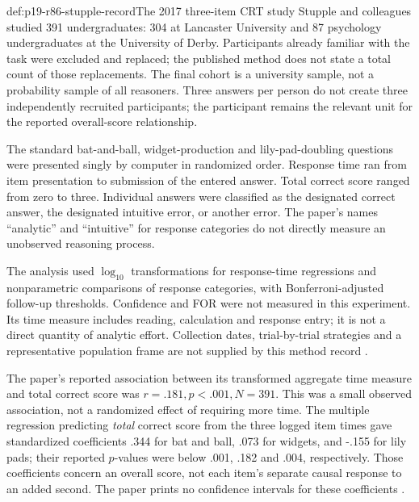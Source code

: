 \begin{hbdefinition}{def:p19-r86-stupple-record}{The 2017 three-item CRT study}
Stupple and colleagues studied 391 undergraduates: 304 at Lancaster University
and 87 psychology undergraduates at the University of Derby. Participants
already familiar with the task were excluded and replaced; the published
method does not state a total count of those replacements. The final cohort
is a university sample, not a probability sample of all reasoners.
Three answers per person do not create three independently recruited
participants; the participant remains the relevant unit for the reported
overall-score relationship.

The standard bat-and-ball, widget-production and lily-pad-doubling questions
were presented singly by computer in randomized order. Response time ran from
item presentation to submission of the entered answer. Total correct score
ranged from zero to three. Individual answers were classified as the designated
correct answer, the designated intuitive error, or another error. The paper's
names ``analytic'' and ``intuitive'' for response categories do not directly
measure an unobserved reasoning process.

The analysis used \(\log_{10}\) transformations for response-time regressions
and nonparametric comparisons of response categories, with Bonferroni-adjusted
follow-up thresholds. Confidence and FOR were not measured in this experiment.
Its time measure includes reading, calculation and response entry; it is not
a direct quantity of analytic effort. Collection dates, trial-by-trial
strategies and a representative population frame are not supplied by this
method record \cite[pp.~6--7]{StuppleEtAl2017Slower}.
\end{hbdefinition}

The paper's reported association between its transformed aggregate time measure
and total correct score was
\(r=.181,p<.001,N=391\). This was a small observed association, not a
randomized effect of requiring more time. The multiple regression predicting
\emph{total} correct score from the three logged item times gave standardized
coefficients .344 for bat and ball, .073 for widgets, and -.155 for lily pads;
their reported \(p\)-values were below .001, .182 and .004, respectively.
Those coefficients concern an overall score, not each item's separate causal
response to an added second. The paper prints no confidence intervals for
these coefficients \cite[pp.~7--9, table~2]{StuppleEtAl2017Slower}.

